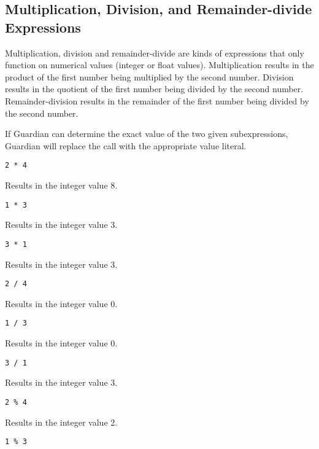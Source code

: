 
\subsection{Multiplication, Division, and Remainder-divide Expressions}
{
	Multiplication, division and remainder-divide are kinds of
	expressions that only function on
	numerical values (integer or float values).
	Multiplication results in the product of the first number being multiplied
	by the second number.
	Division results in the quotient of the first number being divided by the
	second number.
	Remainder-division results in the remainder of the first number being
	divided by the second number.
	
	If Guardian can determine the exact value of the two given subexpressions,
	Guardian will replace the call with the appropriate value literal.
	
	\begin{itemize}
	{
		\item[] \lstinline[language=MAIA, columns=fixed]@2 * 4@
		
			Results in the integer value 8.
		
		\item[] \lstinline[language=MAIA, columns=fixed]@1 * 3@
		
			Results in the integer value 3.
		
		\item[] \lstinline[language=MAIA, columns=fixed]@3 * 1@
		
			Results in the integer value 3.
			
		\item[] \lstinline[language=MAIA, columns=fixed]@2 / 4@
		
			Results in the integer value 0.
		
		\item[] \lstinline[language=MAIA, columns=fixed]@1 / 3@
		
			Results in the integer value 0.
		
		\item[] \lstinline[language=MAIA, columns=fixed]@3 / 1@
		
			Results in the integer value 3.
		
		\item[] \lstinline[language=MAIA, columns=fixed]@2 % 4@
		
			Results in the integer value 2.
		
		\item[] \lstinline[language=MAIA, columns=fixed]@1 % 3@
		
}
\end{itemize}}
